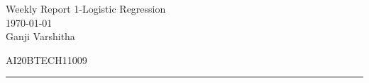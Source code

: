 \documentclass[12pt,letterpaper, onecolumn]{exam}
\begin{document}
\newtheorem{theorem}{Theorem}[section]
\newtheorem{problem}{Problem}
\newtheorem{proposition}{Proposition}[section]
\newtheorem{lemma}{Lemma}[section]
\newtheorem{corollary}[theorem]{Corollary}
\newtheorem{example}{Example}[section]
\newtheorem{definition}[problem]{Definition}

\newcommand{\BEQA}{\begin{eqnarray}}
\newcommand{\EEQA}{\end{eqnarray}}
\newcommand{\define}{\stackrel{\triangle}{=}}

\raggedbottom
\setlength{\parindent}{0pt}
\providecommand{\mbf}{\mathbf}
\providecommand{\norm}[1]{\lVert#1\rVert}
\providecommand{\pr}[1]{\ensuremath{\Pr\left(#1\right)}}
\providecommand{\qfunc}[1]{\ensuremath{Q\left(#1\right)}}
\providecommand{\sbrak}[1]{\ensuremath{{}\left[#1\right]}}
\providecommand{\lsbrak}[1]{\ensuremath{{}\left[#1\right.}}
\providecommand{\rsbrak}[1]{\ensuremath{{}\left.#1\right]}}
\providecommand{\brak}[1]{\ensuremath{\left(#1\right)}}
\providecommand{\lbrak}[1]{\ensuremath{\left(#1\right.}}
\providecommand{\rbrak}[1]{\ensuremath{\left.#1\right)}}
\providecommand{\cbrak}[1]{\ensuremath{\left\{#1\right\}}}
\providecommand{\lcbrak}[1]{\ensuremath{\left\{#1\right.}}
\providecommand{\rcbrak}[1]{\ensuremath{\left.#1\right\}}}
\let\vec\mathbf




\begingroup  
    \centering
    
    \LARGE Weekly Report 1-Logistic Regression\\[0.5em]
    \large \today\\[0.5em]
    \large Ganji Varshitha\par
    \large AI20BTECH11009\par
\endgroup
\rule{\textwidth}{0.4pt}
\pointsdroppedatright   %
\printanswers
\newcommand\Solution{
  \textbf{Solution:}\\}
\newcommand{\myvec}[1]{\ensuremath{\begin{bmatrix}#1\end{bmatrix}}}
\end{document}
